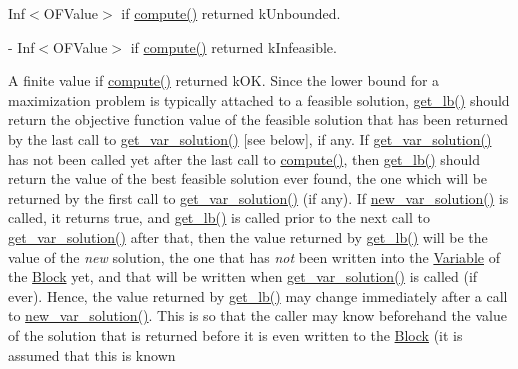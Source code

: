 \begin{DoxyItemize}
\item Inf$<$\+O\+F\+Value$>$ if \mbox{\hyperlink{class_s_m_spp__di__unipi__it_1_1_solver_a504d4e3e174c7a518cc66156a8a45ce5}{compute()}} returned k\+Unbounded.
\item -\/ Inf$<$\+O\+F\+Value$>$ if \mbox{\hyperlink{class_s_m_spp__di__unipi__it_1_1_solver_a504d4e3e174c7a518cc66156a8a45ce5}{compute()}} returned k\+Infeasible.
\item A finite value if \mbox{\hyperlink{class_s_m_spp__di__unipi__it_1_1_solver_a504d4e3e174c7a518cc66156a8a45ce5}{compute()}} returned k\+OK. Since the lower bound for a maximization problem is typically attached to a feasible solution, \mbox{\hyperlink{class_s_m_spp__di__unipi__it_1_1_solver_a4a4dbe4c2416d531c4619ca94fc07d31}{get\+\_\+lb()}} should return the objective function value of the feasible solution that has been returned by the last call to \mbox{\hyperlink{class_s_m_spp__di__unipi__it_1_1_solver_a91d7cd0dc4fa453406ef30db2bfa37a5}{get\+\_\+var\+\_\+solution()}} \mbox{[}see below\mbox{]}, if any. If \mbox{\hyperlink{class_s_m_spp__di__unipi__it_1_1_solver_a91d7cd0dc4fa453406ef30db2bfa37a5}{get\+\_\+var\+\_\+solution()}} has not been called yet after the last call to \mbox{\hyperlink{class_s_m_spp__di__unipi__it_1_1_solver_a504d4e3e174c7a518cc66156a8a45ce5}{compute()}}, then \mbox{\hyperlink{class_s_m_spp__di__unipi__it_1_1_solver_a4a4dbe4c2416d531c4619ca94fc07d31}{get\+\_\+lb()}} should return the value of the best feasible solution ever found, the one which will be returned by the first call to \mbox{\hyperlink{class_s_m_spp__di__unipi__it_1_1_solver_a91d7cd0dc4fa453406ef30db2bfa37a5}{get\+\_\+var\+\_\+solution()}} (if any). If \mbox{\hyperlink{class_s_m_spp__di__unipi__it_1_1_solver_af109b504a566c90a4ea45c1574c128fe}{new\+\_\+var\+\_\+solution()}} is called, it returns true, and \mbox{\hyperlink{class_s_m_spp__di__unipi__it_1_1_solver_a4a4dbe4c2416d531c4619ca94fc07d31}{get\+\_\+lb()}} is called prior to the next call to \mbox{\hyperlink{class_s_m_spp__di__unipi__it_1_1_solver_a91d7cd0dc4fa453406ef30db2bfa37a5}{get\+\_\+var\+\_\+solution()}} after that, then the value returned by \mbox{\hyperlink{class_s_m_spp__di__unipi__it_1_1_solver_a4a4dbe4c2416d531c4619ca94fc07d31}{get\+\_\+lb()}} will be the value of the {\itshape new} solution, the one that has {\itshape not} been written into the \mbox{\hyperlink{class_s_m_spp__di__unipi__it_1_1_variable}{Variable}} of the \mbox{\hyperlink{class_s_m_spp__di__unipi__it_1_1_block}{Block}} yet, and that will be written when \mbox{\hyperlink{class_s_m_spp__di__unipi__it_1_1_solver_a91d7cd0dc4fa453406ef30db2bfa37a5}{get\+\_\+var\+\_\+solution()}} is called (if ever). Hence, the value returned by \mbox{\hyperlink{class_s_m_spp__di__unipi__it_1_1_solver_a4a4dbe4c2416d531c4619ca94fc07d31}{get\+\_\+lb()}} may change immediately after a call to \mbox{\hyperlink{class_s_m_spp__di__unipi__it_1_1_solver_af109b504a566c90a4ea45c1574c128fe}{new\+\_\+var\+\_\+solution()}}. This is so that the caller may know beforehand the value of the solution that is returned before it is even written to the \mbox{\hyperlink{class_s_m_spp__di__unipi__it_1_1_block}{Block}} (it is assumed that this is known 
\end{DoxyItemize}

